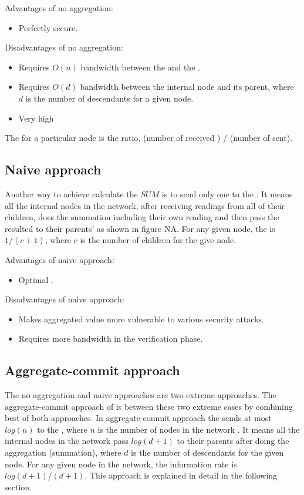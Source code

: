 		Advantages of no aggregation:
		\begin{itemize}
			\item Perfectly secure.
		\end{itemize}  
			
		Disadvantages of no aggregation:
		\begin{itemize}
			\item Requires $O(n)$ bandwidth between the \bs and the \q.
			\item Requires $O(d)$ bandwidth between the internal node and its parent, where $d$ is the number of descendants for a given node.
			\item Very high \inforate
		\end{itemize}
			
	\begin{definition}\label{def:ir}
		The \inforate for a particular node is the \payloads ratio, (number of \payloads received ) / (number of \payloads sent).
	\end{definition}

	\subsection{Naive approach}

			Another way to achieve calculate the $SUM$ is to send only one \payload to the \q.
			It means all the internal nodes in the network, after receiving readings from all of their children, does the summation including their own reading and then pass the resulted \payload to their parents' as shown in figure NA.
			For any given node, the \inforate is $1 / (c + 1)$, where $c$ is the number of children for the give node.

			Advantages of naive approach:
			\begin{itemize}
				\item Optimal \inforate.
			\end{itemize}

			Disadvantages of naive approach:
			\begin{itemize}
				\item Makes aggregated value more vulnerable to various security attacks.
				\item Requires more bandwidth in the verification phase.
			\end{itemize}

	\subsection{Aggregate-commit approach}
		The no aggregation and naive approaches are two extreme approaches.
		The aggregate-commit approach of \cite{chan2006secure} is between these two extreme cases by combining best of both approaches.
		In aggregate-commit approach the \bs sends at most $log(n)$ \payloads to the \q, where $n$ is the number of nodes in the network . 
		It means all the internal nodes in the network pass $log(d + 1)$ \payloads to their parents after doing the aggregation (summation), where $d$ is the number of descendants for the given node. 
		For any given node in the network, the information rate is $log(d+1)/(d+1)$.
		This approach is explained in detail in the following section.     

